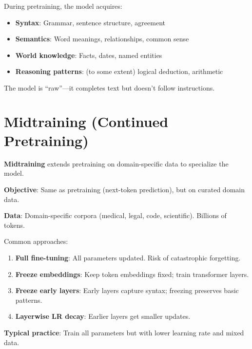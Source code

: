 \begin{remark}
    During pretraining, the model acquires:
    \begin{itemize}
        \item \textbf{Syntax}: Grammar, sentence structure, agreement
        \item \textbf{Semantics}: Word meanings, relationships, common sense
        \item \textbf{World knowledge}: Facts, dates, named entities
        \item \textbf{Reasoning patterns}: (to some extent) logical deduction, arithmetic
    \end{itemize}
    The model is ``raw''---it completes text but doesn't follow instructions.
\end{remark}

\section{Midtraining (Continued Pretraining)}

\begin{definition}[Midtraining]
    \textbf{Midtraining} extends pretraining on domain-specific data to specialize the model.

    \textbf{Objective}: Same as pretraining (next-token prediction), but on curated domain data.

    \textbf{Data}: Domain-specific corpora (medical, legal, code, scientific). Billions of tokens.
\end{definition}

\begin{remark}
    Common approaches:
    \begin{enumerate}
        \item \textbf{Full fine-tuning}: All parameters updated. Risk of catastrophic forgetting.
        \item \textbf{Freeze embeddings}: Keep token embeddings fixed; train transformer layers.
        \item \textbf{Freeze early layers}: Early layers capture syntax; freezing preserves basic patterns.
        \item \textbf{Layerwise LR decay}: Earlier layers get smaller updates.
    \end{enumerate}

    \textbf{Typical practice}: Train all parameters but with lower learning rate and mixed data.
\end{remark}

